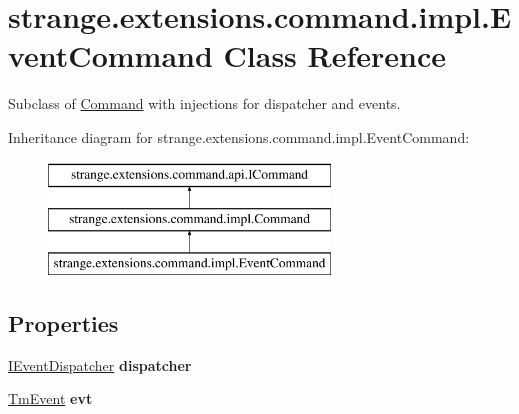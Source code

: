 \hypertarget{classstrange_1_1extensions_1_1command_1_1impl_1_1_event_command}{\section{strange.\-extensions.\-command.\-impl.\-Event\-Command Class Reference}
\label{classstrange_1_1extensions_1_1command_1_1impl_1_1_event_command}
}


Subclass of \hyperlink{classstrange_1_1extensions_1_1command_1_1impl_1_1_command}{Command} with injections for dispatcher and events.  


Inheritance diagram for strange.\-extensions.\-command.\-impl.\-Event\-Command\-:\begin{figure}[H]
\begin{center}
\leavevmode
\includegraphics[height=3.000000cm]{classstrange_1_1extensions_1_1command_1_1impl_1_1_event_command}
\end{center}
\end{figure}
\subsection*{Properties}
\begin{DoxyCompactItemize}
\item 
\hypertarget{classstrange_1_1extensions_1_1command_1_1impl_1_1_event_command_a7636e8b4c3c01ed4f32818fd22d2bd76}{\hyperlink{interfacestrange_1_1extensions_1_1dispatcher_1_1eventdispatcher_1_1api_1_1_i_event_dispatcher}{I\-Event\-Dispatcher} {\bfseries dispatcher}}\label{classstrange_1_1extensions_1_1command_1_1impl_1_1_event_command_a7636e8b4c3c01ed4f32818fd22d2bd76}

\item 
\hypertarget{classstrange_1_1extensions_1_1command_1_1impl_1_1_event_command_a6167b210449ff7400a6b63afd9ff4d14}{\hyperlink{classstrange_1_1extensions_1_1dispatcher_1_1eventdispatcher_1_1impl_1_1_tm_event}{Tm\-Event} {\bfseries evt}}\label{classstrange_1_1extensions_1_1command_1_1impl_1_1_event_command_a6167b210449ff7400a6b63afd9ff4d14}

\end{DoxyCompactItemize}
